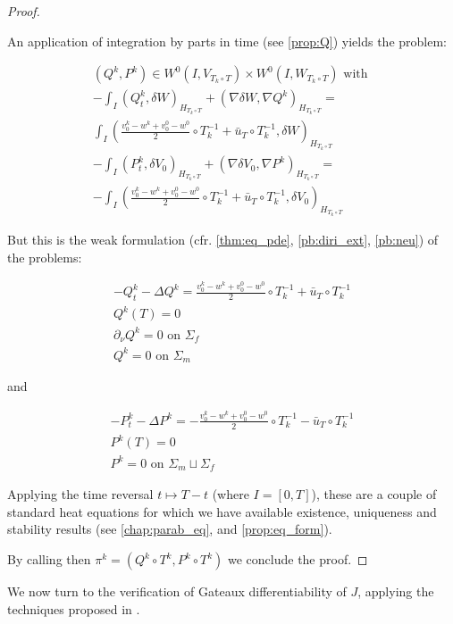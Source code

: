 \documentclass[english,a4paper,12pt,oneside]{scrbook}
\theoremstyle{break}
\newenvironment{mproof}[1][\proofname]{%
  \begin{proof}[#1]$ $\par\nobreak\ignorespaces
}{%
  \end{proof}
}
\renewcommand*{\proofname}{Proof}
\theoremstyle{remark}
\begin{document}
\begin{mproof}
An application of integration by parts in time (see \cref{prop:Q}) yields the problem:

\begin{align*}
(Q^k, P^k) \in W^0(I, V_{T_k \circ T})\times W^0(I, W_{T_k \circ T}) \text{ with }\\
-\int_I ( Q^k_t, \delta W )_{H_{T_k \circ T}}+ (\nabla \delta W, \nabla Q^k)_{H_{T_k \circ T}} =\\ \int_I \left (\frac{v_0^k-w^k+v_0^0-w^0}{2}\circ T_k^{-1}+\bar{u}_T\circ T_k^{-1} ,\delta W\right)_{H_{T_k \circ T}}\\
-\int_I( P^k_t, \delta V_0)_{H_{T_k \circ T}} + ( \nabla \delta V_0, \nabla P^k)_{H_{T_k \circ T}} =\\- \int_I \left (\frac{v_0^k-w^k+v_0^0-w^0}{2}\circ T_k^{-1}+\bar{u}_T\circ T_k^{-1} ,\delta V_0\right)_{H_{T_k \circ T}}
\end{align*}

But this is the weak formulation (cfr. \cref{thm:eq_pde}, \cref{pb:diri_ext}, \cref{pb:neu}) of the problems:

\begin{align*}
-Q^k_t-\Delta Q^k =\frac{v_0^k-w^k+v_0^0-w^0}{2}\circ T_k^{-1}+\bar{u}_T\circ T_k^{-1} \\
Q^k(T)=0\\
\partial_\nu Q^k = 0 \text{ on } \Sigma_f\\
Q^k = 0 \text{ on } \Sigma_m
\end{align*}

and

\begin{align*}
-P^k_t-\Delta P^k =-\frac{v_0^k-w^k+v_0^0-w^0}{2}\circ T_k^{-1}-\bar{u}_T\circ T_k^{-1} \\
P^k(T)=0\\
P^k = 0 \text{ on } \Sigma_m \sqcup \Sigma_f
\end{align*}

Applying the time reversal $t\mapsto T -t$ (where $I = [0,T]$), these are a couple of standard heat equations for which we have available existence, uniqueness and stability results (see \cref{chap:parab_eq}, and \cref{prop:eq_form}).

By calling then $\pi^k = (Q^k \circ T^k,P^k \circ T^k)$ we conclude the proof.

\end{mproof}

We now turn to the verification of Gateaux differentiability of $J$, applying the techniques proposed in \cite{avg_adj}.
\end{document}
